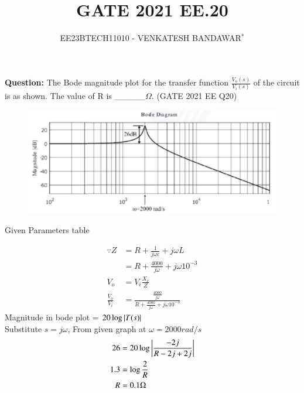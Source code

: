 \documentclass[journal,12pt,twocolumn]{IEEEtran}
\theoremstyle{remark}
\begin{document}

\vspace{3cm}

\title{GATE 2021 EE.20}
\author{EE23BTECH11010 - VENKATESH BANDAWAR$^{*}$%
}
\maketitle
\newpage
\bigskip
\textbf{Question:} The Bode magnitude plot for the transfer function $\frac{V_o(s)}{V_i(s)}$ of the circuit is as shown. The value of R is \_\_\_\_\_$\Omega$. \hfill(GATE 2021 EE Q20)
\begin{figure}[!ht]
    \centering
    
\end{figure}
\begin{figure}[!ht]
    \centering
    \includegraphics[width=\columnwidth]{figs/bode.png}
\end{figure}
\solution
\begin{table}[!ht]
    \centering
    
    \caption{Given Parameters table}
    \label{Given Parameters table_2021_EE_20}
\end{table}

\begin{align}
    \because Z &= R + \frac{1}{j\omega c} + j\omega L\\
    &= R + \frac{4000}{j\omega} + j\omega 10^{-3}\\
    V_o &= V_i \frac{X_c}{Z}\\
    \frac{V_o}{V_i} &= \frac{\frac{4000}{j\omega}}{R + \frac{4000}{j\omega} + j\omega 10^{-3}}
\end{align}
Magnitude in bode plot = $20\log \left\vert T(s)\right\vert$\\
Substitute $s = j\omega$, From given graph at $\omega = 2000rad/s $
\begin{align}
    26 &= 20 \log\left\vert\frac{-2j}{R - 2j + 2j}\right\vert\\
    1.3 &= \log\frac{2}{R}\\
    R &= 0.1 \Omega
\end{align}
\end{document}
